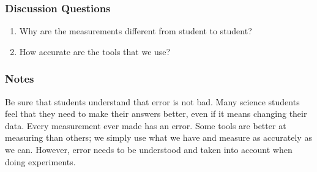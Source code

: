 \subsubsection*{Discussion Questions}
\begin{enumerate}
\item{Why are the measurements different from student to student?}
\item{How accurate are the tools that we use?}
\end{enumerate}

\subsubsection*{Notes}
Be sure that students understand that error is not bad.  Many science students feel that they need to make their answers better, even if it means changing their data.  Every measurement ever made has an error.  Some tools are better at measuring than others; we simply use what we have and measure as accurately as we can.  However, error needs to be understood and taken into account when doing experiments.